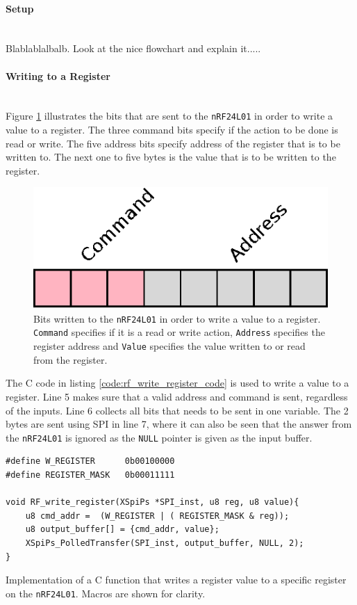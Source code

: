 \paragraph{Setup} %
\label{par:setup}
~\\
Blablablalbalb.
Look at the nice flowchart and explain it.....

\paragraph{Writing to a Register} %
\label{par:writing_to_a_register}
~\\
Figure \ref{fig:rw_register} illustrates the bits that are sent to the \texttt{nRF24L01} in order to write a value to a register. 
The three command bits specify if the action to be done is read or write.
The five address bits specify address of the register that is to be written to. 
The next one to five bytes is the value that is to be written to the register.

\begin{figure}[h]
	\centering
	\includegraphics[width=.3\linewidth]{graphics/rw_register.eps}
	\caption[Writing bits to a register on nRF24L01.]{Bits written to the \texttt{nRF24L01} in order to write a value to a register. \texttt{Command} specifies if it is a read or write action, \texttt{Address} specifies the register address and \texttt{Value} specifies the value written to or read from the register.}
	\label{fig:rw_register}
\end{figure}

The C code in listing \ref{code:rf_write_register_code} is used to write a value to a register. 
Line 5 makes sure that a valid address and command is sent, regardless of the inputs.
Line 6 collects all bits that needs to be sent in one variable. 
The 2 bytes are sent using SPI in line 7, where it can also be seen that the answer from the \texttt{nRF24L01} is ignored as the \texttt{NULL} pointer is given as the input buffer.  

\begin{listing}[h]
\begin{verbatim}
#define W_REGISTER      0b00100000
#define REGISTER_MASK   0b00011111

void RF_write_register(XSpiPs *SPI_inst, u8 reg, u8 value){
	u8 cmd_addr =  (W_REGISTER | ( REGISTER_MASK & reg));
	u8 output_buffer[] = {cmd_addr, value};
	XSpiPs_PolledTransfer(SPI_inst, output_buffer, NULL, 2);
}
\end{verbatim}
\caption{Implementation of a C function that writes a register value to a specific register on the \texttt{nRF24L01}. Macros are shown for clarity.}
\label{code:rf_write_register_code}
\end{listing}

